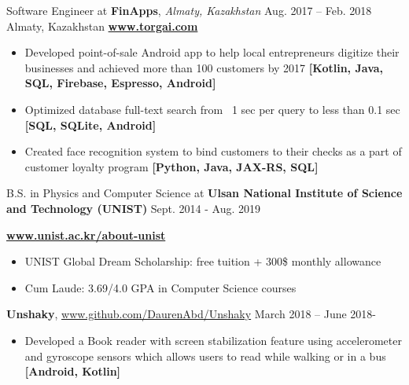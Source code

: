 \documentclass[10pt,a4paper]{altacv}
\begin{document}
    \medskip

    \cveventflat
    {Software Engineer at }
    {\textbf{FinApps}, \textit{Almaty, Kazakhstan}}
    {Aug. 2017 -- Feb. 2018}
    {Almaty, Kazakhstan}
    \newline
    \href{https://torgai.com/}{\textbf{www.torgai.com}}
    \begin{itemize}
        \item Developed point-of-sale Android app to help local entrepreneurs digitize their businesses and achieved more than 100 customers by 2017
        \textbf{[Kotlin, Java, SQL, Firebase, Espresso, Android]}
        \item Optimized database full-text search from ~1 sec per query to less than 0.1 sec
        \textbf{[SQL, SQLite, Android]}
        \item Created face recognition system to bind customers to their checks as a part of customer loyalty program
        \textbf{[Python, Java, JAX-RS, SQL]}
    \end{itemize}

    \large

    \cveventeducation
    {B.S. in Physics and Computer Science at }
    {\textbf{Ulsan National Institute of Science and Technology (UNIST)}}
    {Sept. 2014 - Aug. 2019}
    {\href{https://www.unist.ac.kr/about-unist/}{\textbf{www.unist.ac.kr/about-unist}}
        \begin{itemize}
            \item {UNIST Global Dream Scholarship: free tuition + 300\$ monthly allowance}
            \item {Cum Laude: 3.69/4.0 GPA in Computer Science courses}
        \end{itemize}}

    \cveventflat
    {\textbf{Unshaky}, }
    {{\href{https://www.github.com/DaurenAbd/Unshaky/}{www.github.com/DaurenAbd/Unshaky}}}
    {March 2018 -- June 2018}{}-
    \begin{itemize}
        \item Developed a Book reader with screen stabilization feature using accelerometer and gyroscope sensors which allows users to read while walking or in a bus
        \textbf{[Android, Kotlin]}
    \end{itemize}
\end{document}

